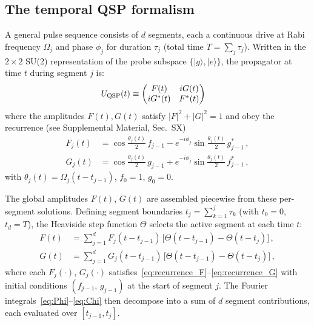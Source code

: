 \documentclass[aps,pra,twocolumn,superscriptaddress,longbibliography]{revtex4-2}
\begin{document}
\subsection{The temporal QSP formalism}
\label{sec:tqsp_formalism}

A general pulse sequence consists of $d$ segments, each a continuous drive at Rabi frequency
$\Omega_j$ and phase $\phi_j$ for duration $\tau_j$ (total time $T = \sum_j\tau_j$).
Written in the $2\times 2$ SU(2) representation of the probe subspace
$\{|g\rangle,|e\rangle\}$, the propagator at time $t$ during segment $j$ is:
\begin{align}
  U_{\rm QSP}(t) &\equiv \begin{pmatrix} F(t) & iG(t) \\ iG^*(t) & F^*(t) \end{pmatrix}
  \label{eq:u_qsp_poly}
\end{align}
where the amplitudes $F(t), G(t)$ satisfy $|F|^2+|G|^2=1$ and obey the
recurrence (see Supplemental Material, Sec.~SX)
\begin{align}
  F_j(t) &= \cos\tfrac{\theta_j(t)}{2}\,f_{j-1} - e^{-i\phi_j}\sin\tfrac{\theta_j(t)}{2}\,g_{j-1}^*\,,
  \label{eq:recurrence_F} \\
  G_j(t) &= \cos\tfrac{\theta_j(t)}{2}\,g_{j-1} + e^{-i\phi_j}\sin\tfrac{\theta_j(t)}{2}\,f_{j-1}^*\,,
  \label{eq:recurrence_G}
\end{align}
with $\theta_j(t) = \Omega_j(t - t_{j-1})$, $f_0 = 1$, $g_0 = 0$.

The global amplitudes $F(t)$, $G(t)$ are assembled piecewise from these
per-segment solutions.  Defining segment boundaries $t_j = \sum_{k=1}^j\tau_k$
(with $t_0=0$, $t_d=T$), the Heaviside step function $\Theta$ selects the active segment
at each time $t$:
\begin{align}
  F(t) &= \sum_{j=1}^{d} F_j(t-t_{j-1})\,\bigl[\Theta(t-t_{j-1})-\Theta(t-t_j)\bigr]\,,
  \label{eq:F_piecewise}\\
  G(t) &= \sum_{j=1}^{d} G_j(t-t_{j-1})\,\bigl[\Theta(t-t_{j-1})-\Theta(t-t_j)\bigr]\,,
  \label{eq:G_piecewise}
\end{align}
where each $F_j(\cdot)$, $G_j(\cdot)$ satisfies~\eqref{eq:recurrence_F}--\eqref{eq:recurrence_G}
with initial conditions $(f_{j-1},\,g_{j-1})$ at the start of segment $j$.
The Fourier integrals~\eqref{eq:Phi}--\eqref{eq:Chi} then decompose into a sum of
$d$ segment contributions, each evaluated over $[t_{j-1},t_j]$.
\end{document}
